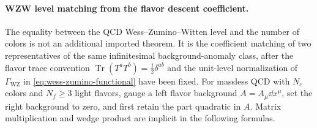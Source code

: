 \paragraph{WZW level matching from the flavor descent coefficient.}
\label{par:wzw-anomaly-matching}
The equality between the QCD Wess--Zumino--Witten level and the number of
colors is not an additional imported theorem.  It is the coefficient matching
of two representatives of the same infinitesimal background-anomaly class,
after the flavor trace convention
\(\operatorname{Tr}(T^aT^b)=\frac12\delta^{ab}\) and the unit-level
normalization of \(\Gamma_{\mathrm{WZ}}\) in
\eqref{eq:wess-zumino-functional} have been fixed.  For massless QCD with
\(N_c\) colors and \(N_f\ge3\) light flavors, gauge a left flavor background
\(A=A_\mu\dd x^\mu\), set the right background to zero, and first retain the
part quadratic in \(A\).  Matrix multiplication and wedge product are
implicit in the following formulas.

